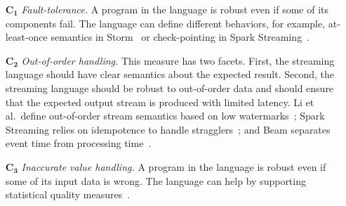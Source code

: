 \begin{itemize}
  \item[$\mathbf{C_1}$] \emph{Fault-tolerance.} A program in the
    language is robust even if some of its components fail. The
    language can define different behaviors, for example,
    at-least-once semantics in Storm~\cite{toshniwal_et_al_2014}
    or check-pointing in Spark Streaming~\cite{zaharia_et_al_2013}.
  \item[$\mathbf{C_2}$] \emph{Out-of-order handling.} This measure has
    two facets. First, the streaming language should have clear
    semantics about the expected result. Second, the streaming language should be
    robust to out-of-order data and should ensure that the expected
    output stream is produced with limited latency. Li et al.\ define
    out-of-order stream semantics based on low
    watermarks~\cite{Li:2008:OPN:1453856.1453890}; Spark Streaming
    relies on idempotence to handle stragglers~\cite{zaharia_et_al_2013}; and Beam separates
    event time from processing time~\cite{akidau_et_al_2015}.
  \item[$\mathbf{C_3}$] \emph{Inaccurate value handling.} A program in
    the language is robust even if some of its input data is wrong.
    The language can help by supporting statistical quality
    measures~\cite{wasserkrug_et_al_2008}.
\end{itemize}


